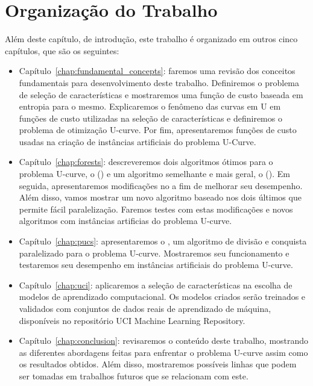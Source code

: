 \section{Organização do Trabalho}
Além deste capítulo, de introdução, este trabalho é organizado em outros
cinco capítulos, que são os seguintes:
\begin{itemize}
    \item{Capítulo~\ref{chap:fundamental_concepts}:} faremos uma revisão
        dos conceitos fundamentais para desenvolvimento deste trabalho. 
        Definiremos o problema de seleção de características e 
        mostraremos uma função de custo baseada em entropia para o 
        mesmo. Explicaremos o fenômeno das curvas em U em funções de
        custo utilizadas na seleção de características e definiremos
        o problema de otimização U-curve. Por fim, apresentaremos
        funções de custo usadas na criação de instâncias artificiais do  
        problema U-Curve.
    \item{Capítulo~\ref{chap:forests}:} descreveremos dois algoritmos
        ótimos para o problema U-curve, o 
         () e um 
        algoritmo semelhante e mais geral, o 
         (). Em seguida, 
        apresentaremos modificações no  a fim de  melhorar
        seu desempenho. Além disso, vamos mostrar um novo algoritmo
        baseado nos dois últimos que permite fácil paralelização. 
        Faremos testes com estas modificações e novos algoritmos com
        instâncias artificias do problema U-curve.
    \item{Capítulo~\ref{chap:pucs}:} apresentaremos o 
        , um algoritmo de 
        divisão e conquista paralelizado para o problema U-curve. 
        Mostraremos seu funcionamento e testaremos seu desempenho em 
        instâncias artificiais do problema U-curve.
    \item{Capítulo~\ref{chap:uci}:} aplicaremos a seleção de 
        características na escolha de modelos de aprendizado 
        computacional. Os modelos criados serão treinados e validados
        com conjuntos de dados reais de aprendizado de máquina, 
        disponíveis no repositório UCI Machine Learning Repository.
    \item{Capítulo~\ref{chap:conclusion}:} revisaremos o conteúdo deste
        trabalho, mostrando as diferentes abordagens feitas para 
        enfrentar o problema U-curve assim como os resultados obtidos.
        Além disso, mostraremos possíveis linhas que podem ser tomadas 
        em trabalhos futuros que se relacionam com este.
\end{itemize}
